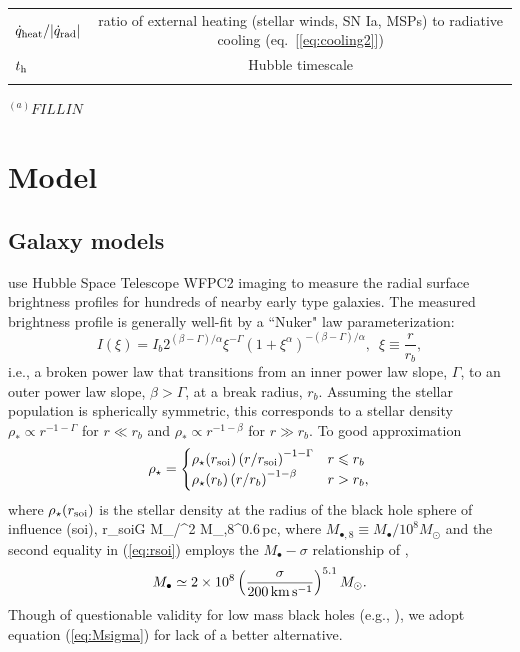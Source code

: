 \documentclass[usenatbib,fleqn]{mn2e}
\newcommand{\rb}{r_b}
\newcommand{\rhostar}{\rho_*}
\newcommand{\Mbh}[1][]{M_{\bullet#1}}
\newcommand{\soi}{\rm soi}
\newcommand{\rsoi}{r_{\soi}}
\begin{document}
\begin{table}
\begin{threeparttable}
\begin{minipage}{18cm}
\begin{tabular}{lc}
$\dot{q}_{\rm heat}/|\dot{q}_{\rm rad}|$ & ratio of external heating (stellar winds, SN Ia, MSPs) to radiative cooling (eq.~[\ref{eq:cooling2}]) \\
$t_{\rm h}$ & Hubble timescale \\
\hline
\label{table:definitions}  
\end{tabular}
\begin{tablenotes}
\item{$^{(a)}FILL IN$}
\end{tablenotes}
\end{minipage}
\end{threeparttable}

\end{table}


\section{Model}
\label{sec:model}
\subsection{Galaxy models}
\label{sec:gal_model}
\citet{LauerFaber+:2007a} use Hubble Space Telescope WFPC2 imaging to measure the radial surface brightness profiles for hundreds of nearby early type galaxies. The measured brightness profile is generally well-fit by a ``Nuker" law parameterization:
\begin{equation}
  I(\xi)=I_b 2^{(\beta-\Gamma)/\alpha} \xi^{-\Gamma} (1+\xi^\alpha)^{-(\beta-\Gamma)/\alpha}, \,\,\,\xi\equiv\frac{r}{r_b},
\end{equation}
i.e., a broken power law that transitions from an inner power law slope, $\Gamma$, to an outer power law slope, $\beta > \Gamma$, at a break radius, $\rb$.  Assuming the stellar population is spherically symmetric, this corresponds to a stellar density $\rhostar \propto r^{-1-\Gamma}$ for $r \ll \rb$ and $\rhostar\propto r^{-1-\beta}$ for $r \gg \rb$.  To good approximation
\begin{align}
\rho_\star = 
\begin{cases}
\rho_\star(\rsoi) \left(r/\rsoi\right)^{-1-\Gamma} & r \leq r_b\\
\rho_\star(r_b) \left(r/r_b\right)^{-1-\beta} & r > r_b,
\label{eq:rhostar}
\end{cases}
\end{align}
where $\rho_\star(\rsoi)$ is the stellar density at the radius of the black hole sphere of influence (soi), 
\be
\rsoi \simeq G \Mbh/\sigma^2  M_{\bullet,8}^{0.6}\,{\rm pc},
\label{eq:rsoi}
\ee
where $M_{\bullet,8} \equiv M_{\bullet}/10^{8}M_{\odot}$ and the second equality in (\ref{eq:rsoi}) employs the $\Mbh-\sigma$ relationship of \citet{Gultekin+09},
 \begin{align}
M_{\bullet} \simeq 2\times 10^{8}\left(\frac{\sigma}{200\,{\rm
      km\,s^{-1}}}\right)^{5.1}M_{\odot}.
\label{eq:Msigma}
\end{align}
Though of questionable validity for low mass black holes (e.g., \citealt{Greene&Ho07}), we adopt equation (\ref{eq:Msigma}) for lack of a better alternative.
\end{document}
